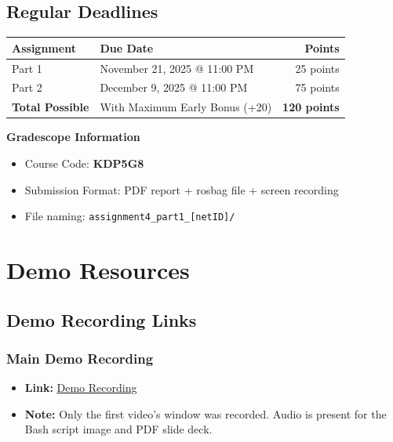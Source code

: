 \documentclass[11pt,a4paper]{article}
\begin{document}
\subsection{Regular Deadlines}

\begin{table}[h!]
\centering
\begin{tabularx}{\textwidth}{lXr}
\toprule
\textbf{Assignment} & \textbf{Due Date} & \textbf{Points} \\
\midrule
Part 1 & November 21, 2025 @ 11:00 PM & 25 points \\
Part 2 & December 9, 2025 @ 11:00 PM & 75 points \\
\midrule
\textbf{Total Possible} & With Maximum Early Bonus (+20) & \textbf{120 points} \\
\bottomrule
\end{tabularx}
\end{table}

\begin{infobox}
\textbf{Gradescope Information}
\begin{itemize}[nosep]
    \item Course Code: \textbf{KDP5G8}
    \item Submission Format: PDF report + rosbag file + screen recording
    \item File naming: \texttt{assignment4\_part1\_[netID]/}
\end{itemize}
\end{infobox}

\section{Demo Resources}

\subsection{Demo Recording Links}

\subsubsection{Main Demo Recording}
\begin{itemize}
    \item \textbf{Link:} \href{https://drive.google.com/file/d/1TVCehZ8cksYwapauqrUs_4s2lsiecR_E/view?usp=share_link}{Demo Recording}
    \item \textbf{Note:} Only the first video's window was recorded. Audio is present for the Bash script image and PDF slide deck.
\end{itemize}
\end{document}
